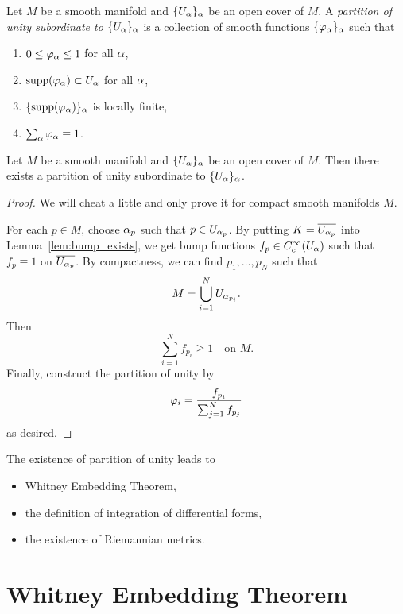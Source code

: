 \begin{definition}
  Let \(M\) be a smooth manifold and \(\{U_\alpha\}_\alpha\) be an open cover of \(M\). A \emph{partition of unity subordinate to \(\{U_\alpha\}_\alpha\)} is a collection of smooth functions \(\{\varphi_\alpha\}_\alpha\) such that \begin{enumerate}
    \item \(0 \leq \varphi_\alpha \leq 1\) for all \(\alpha\),
    \item \(\operatorname{supp}(\varphi_\alpha) \subset U_\alpha\) for all \(\alpha\),
    \item \(\{\operatorname{supp}(\varphi_\alpha)\}_\alpha\) is locally finite,
    \item \(\sum_\alpha \varphi_\alpha\equiv 1\).
  \end{enumerate}
\end{definition}

\begin{theorem}
  Let \(M\) be a smooth manifold and \(\{U_\alpha\}_\alpha\) be an open cover of \(M\). Then there exists a partition of unity subordinate to \(\{U_\alpha\}_\alpha\).
\end{theorem}
\begin{proof} %
  We will cheat a little and only prove it for compact smooth manifolds \(M\).

  For each \(p\in M\), choose \(\alpha_p\) such that \(p\in U_{\alpha_p}\). By putting \(K = \overline{U_{\alpha_p}}\) into Lemma~\ref{lem:bump_exists},
  we get bump functions \(f_p\in C_c^\infty(U_\alpha)\) such that \(f_p\equiv 1\) on \(\overline{U_{\alpha_p}}\).
  By compactness, we can find \(p_1,\ldots,p_N\) such that \[
    M = \bigcup_{i=1}^N U_{\alpha_{p_i}}.
  \]
  Then \[
    \sum_{i=1}^N f_{p_i} \geq 1 \quad\text{on } M.
  \]
  Finally, construct the partition of unity by \[
    \varphi_i = \frac{f_{p_i}}{\sum_{j=1}^N f_{p_j}}
  \] as desired.
\end{proof}

The existence of partition of unity leads to \begin{itemize}
  \item Whitney Embedding Theorem,
  \item the definition of integration of differential forms,
  \item the existence of Riemannian metrics.
\end{itemize}

\newpage

\section[Whitney Embedding Theorem]{Whitney Embedding Theorem}

